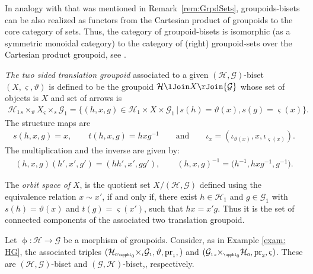 \documentclass[10pt,a4paper]{amsart}
\numberwithin{equation}{section}
\newcommand{\Ga}{\cG_{\Sscript{1}}}
\newcommand{\Ho}{\cH_{\Sscript{0}}}
\newcommand{\Ha}{\cH_{\Sscript{1}}}
\newcommand{\cG}{{\mathcal G}}
\newcommand{\cH}{{\mathcal H}}
\newcommand{\Sscript}[1]{\scriptscriptstyle{#1}}
\newcommand{\due}[3]{{}_{{#2 }} {#1}_{{ #3}} }
\begin{document}
In analogy with that was mentioned in Remark~\ref{rem:GrpdSets}, groupoids-bisets can be also realized as functors from the Cartesian product of groupoids to the core category of sets. Thus, the category of groupoid-bisets is isomorphic (as a symmetric monoidal category) to the category of (right) groupoid-sets over the Cartesian product groupoid, see \cite[Proposition~3.12]{Kaoutit/Spinosa:2018}.

\emph{The two sided translation groupoid} associated to a given $(\cH, \cG)$-biset $(X,\varsigma, \vartheta)$ is defined to be the groupoid $\cH \lJoin X \rJoin \cG$ whose set of objects is $X$ and set of arrows is
\begin{gather*}
\cH_{\Sscript{1}} \due \times {\Sscript{{s}}} {\Sscript{\vartheta}} X \due \times {\Sscript{\varsigma}}{\Sscript{{s}}} \cG_{\Sscript{1}} = \big\{ (h,x,g) \in\cH_{\Sscript{1}}\times X \times \cG_{\Sscript{1}}\,|\, {s}(h)= \vartheta(x), {s}(g)=\varsigma(x) \big\}.
\end{gather*}
The structure maps are
\begin{gather*}
{s}(h,x,g)=x,\qquad {t}(h,x,g)=hxg^{-1}\qquad \text{and}\qquad \iota_{\Sscript{x}}=(\iota_{\Sscript{\vartheta(x)}}, x,\iota_{\Sscript{\varsigma(x)}}).
\end{gather*}
The multiplication and the inverse are given by:
\begin{gather*}
(h,x,g) (h',x',g') = (hh',x',gg'),\qquad (h,x,g)^{-1}=\big(h^{-1}, hxg^{-1}, g^{-1}\big).
\end{gather*}

The \emph{orbit space of} $X$, is the quotient set $X / (\cH,\cG)$ defined using the equivalence relation $x \sim x'$, if and only if, there exist $h \in \Ha$ and $g \in \Ga$ with $s(h)=\vartheta(x)$ and $t(g)=\varsigma(x')$, such that $hx = x'g$. Thus it is the set of connected components of the associated two translation groupoid.

\begin{Example}\label{exam:bisets}Let $\upphi\colon \cH \to \cG$ be a morphism of groupoids. Consider, as in Example \ref{exam: HG}, the associated triples $(\Ho \due \times {\Sscript{\upphi_0}} { \Sscript{t}} \Ga, \vartheta, {\rm pr}_{\Sscript{1}},)$ and $(\Ga \due \times {\Sscript{s}} { \Sscript{\upphi_0}} \Ho, {\rm pr}_{\Sscript{2}}, \varsigma)$. These are $(\cH, \cG)$-biset and $(\cG,\cH)$-biset,, respectively.
\end{Example}
\end{document}
